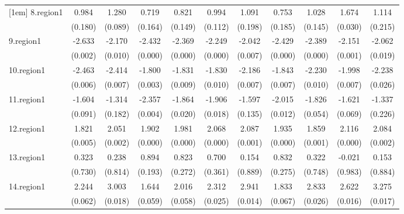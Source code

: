 \begin{tabular}{l*{10}{c}}
[1em]
8.region1   &       0.984&       1.280&       0.719&       0.821&       0.994&       1.091&       0.753&       1.028&       1.674&       1.114\\
            &     (0.180)&     (0.089)&     (0.164)&     (0.149)&     (0.112)&     (0.198)&     (0.185)&     (0.145)&     (0.030)&     (0.215)\\
[1em]
9.region1   &      -2.633&      -2.170&      -2.432&      -2.369&      -2.249&      -2.042&      -2.429&      -2.389&      -2.151&      -2.062\\
            &     (0.002)&     (0.010)&     (0.000)&     (0.000)&     (0.000)&     (0.007)&     (0.000)&     (0.000)&     (0.001)&     (0.019)\\
[1em]
10.region1  &      -2.463&      -2.414&      -1.800&      -1.831&      -1.830&      -2.186&      -1.843&      -2.230&      -1.998&      -2.238\\
            &     (0.006)&     (0.007)&     (0.003)&     (0.009)&     (0.010)&     (0.007)&     (0.007)&     (0.010)&     (0.007)&     (0.026)\\
[1em]
11.region1  &      -1.604&      -1.314&      -2.357&      -1.864&      -1.906&      -1.597&      -2.015&      -1.826&      -1.621&      -1.337\\
            &     (0.091)&     (0.182)&     (0.004)&     (0.020)&     (0.018)&     (0.135)&     (0.012)&     (0.054)&     (0.069)&     (0.226)\\
[1em]
12.region1  &       1.821&       2.051&       1.902&       1.981&       2.068&       2.087&       1.935&       1.859&       2.116&       2.084\\
            &     (0.005)&     (0.002)&     (0.000)&     (0.000)&     (0.000)&     (0.001)&     (0.000)&     (0.001)&     (0.000)&     (0.002)\\
[1em]
13.region1  &       0.323&       0.238&       0.894&       0.823&       0.700&       0.154&       0.832&       0.322&      -0.021&       0.153\\
            &     (0.730)&     (0.814)&     (0.193)&     (0.272)&     (0.361)&     (0.889)&     (0.275)&     (0.748)&     (0.983)&     (0.884)\\
[1em]
14.region1  &       2.244&       3.003&       1.644&       2.016&       2.312&       2.941&       1.833&       2.833&       2.622&       3.275\\
            &     (0.062)&     (0.018)&     (0.059)&     (0.058)&     (0.025)&     (0.014)&     (0.067)&     (0.026)&     (0.016)&     (0.017)\\

\end{tabular}
